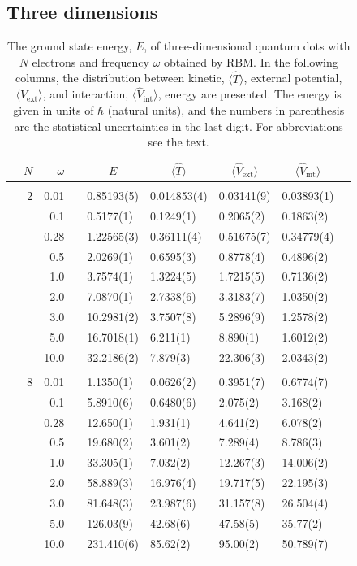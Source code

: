 \subsection{Three dimensions}
\begin{table}[H]
	\caption{The ground state energy, $E$, of three-dimensional quantum dots with $N$ electrons and frequency $\omega$ obtained by RBM. In the following columns, the distribution between kinetic, $\langle\hat{T}\rangle$, external potential, $\langle\hat{V}_{\text{ext}}\rangle$, and interaction, $\langle\hat{V}_{\text{int}}\rangle$, energy are presented. The energy is given in units of $\hbar$ (natural units), and the numbers in parenthesis are the statistical uncertainties in the last digit. For abbreviations see the text.}
	\label{tab:splitfrequencyQDRBM3D}
	\begin{tabularx}{\textwidth}{R{1cm}rrcR{2.3cm}R{2.3cm}R{2.3cm}R{2.3cm}R{1cm}} \hline\hline
		\makecell{\\ \phantom{$N$}} & $N$ & $\omega$ &&  &  &  &  & \\ \hline \\
		&2 & 0.01 && 0.85193(5) & 0.014853(4) & 0.03141(9) & 0.03893(1) \\
		&& 0.1 && 0.5177(1) & 0.1249(1) & 0.2065(2) & 0.1863(2) \\
		&& 0.28 && 1.22565(3) & 0.36111(4) & 0.51675(7) & 0.34779(4) \\
		&& 0.5 && 2.0269(1) & 0.6595(3) & 0.8778(4) & 0.4896(2) \\
		&& 1.0 && 3.7574(1) & 1.3224(5) & 1.7215(5) & 0.7136(2) \\
		&& 2.0 && 7.0870(1) & 2.7338(6) & 3.3183(7) & 1.0350(2) \\
		&& 3.0 && 10.2981(2) & 3.7507(8) & 5.2896(9) & 1.2578(2) \\ 
		&& 5.0 && 16.7018(1) & 6.211(1) & 8.890(1) & 1.6012(2) \\
		&& 10.0 && 32.2186(2) & 7.879(3) & 22.306(3) & 2.0343(2) \\
		\hline \\
		
		&8 & 0.01 && 1.1350(1) & 0.0626(2) & 0.3951(7) & 0.6774(7) \\
		&& 0.1 && 5.8910(6) & 0.6480(6) & 2.075(2) & 3.168(2) \\
		&& 0.28 && 12.650(1) & 1.931(1) & 4.641(2) & 6.078(2) \\
		&& 0.5 && 19.680(2) & 3.601(2) & 7.289(4) & 8.786(3) \\
		&& 1.0 && 33.305(1) & 7.032(2) & 12.267(3) & 14.006(2) \\
		&& 2.0 && 58.889(3) & 16.976(4) & 19.717(5) & 22.195(3) \\
		&& 3.0 && 81.648(3) & 23.987(6) & 31.157(8) & 26.504(4) \\ 
		&& 5.0 && 126.03(9) & 42.68(6) & 47.58(5) & 35.77(2) \\
		&& 10.0 && 231.410(6) & 85.62(2) & 95.00(2) & 50.789(7) \\
		\hline \\
		

\end{tabularx}
\end{table}

